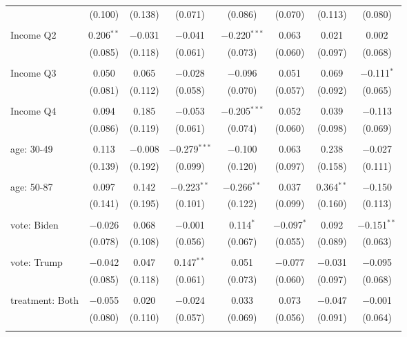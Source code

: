 \begin{tabular}{@{\extracolsep{5pt}}lccccccc}
  & (0.100) & (0.138) & (0.071) & (0.086) & (0.070) & (0.113) & (0.080) \\ 
  & & & & & & & \\ 
 Income Q2 & 0.206$^{**}$ & $-$0.031 & $-$0.041 & $-$0.220$^{***}$ & 0.063 & 0.021 & 0.002 \\ 
  & (0.085) & (0.118) & (0.061) & (0.073) & (0.060) & (0.097) & (0.068) \\ 
  & & & & & & & \\ 
 Income Q3 & 0.050 & 0.065 & $-$0.028 & $-$0.096 & 0.051 & 0.069 & $-$0.111$^{*}$ \\ 
  & (0.081) & (0.112) & (0.058) & (0.070) & (0.057) & (0.092) & (0.065) \\ 
  & & & & & & & \\ 
 Income Q4 & 0.094 & 0.185 & $-$0.053 & $-$0.205$^{***}$ & 0.052 & 0.039 & $-$0.113 \\ 
  & (0.086) & (0.119) & (0.061) & (0.074) & (0.060) & (0.098) & (0.069) \\ 
  & & & & & & & \\ 
 age: 30-49 & 0.113 & $-$0.008 & $-$0.279$^{***}$ & $-$0.100 & 0.063 & 0.238 & $-$0.027 \\ 
  & (0.139) & (0.192) & (0.099) & (0.120) & (0.097) & (0.158) & (0.111) \\ 
  & & & & & & & \\ 
 age: 50-87 & 0.097 & 0.142 & $-$0.223$^{**}$ & $-$0.266$^{**}$ & 0.037 & 0.364$^{**}$ & $-$0.150 \\ 
  & (0.141) & (0.195) & (0.101) & (0.122) & (0.099) & (0.160) & (0.113) \\ 
  & & & & & & & \\ 
 vote: Biden & $-$0.026 & 0.068 & $-$0.001 & 0.114$^{*}$ & $-$0.097$^{*}$ & 0.092 & $-$0.151$^{**}$ \\ 
  & (0.078) & (0.108) & (0.056) & (0.067) & (0.055) & (0.089) & (0.063) \\ 
  & & & & & & & \\ 
 vote: Trump & $-$0.042 & 0.047 & 0.147$^{**}$ & 0.051 & $-$0.077 & $-$0.031 & $-$0.095 \\ 
  & (0.085) & (0.118) & (0.061) & (0.073) & (0.060) & (0.097) & (0.068) \\ 
  & & & & & & & \\ 
 treatment: Both & $-$0.055 & 0.020 & $-$0.024 & 0.033 & 0.073 & $-$0.047 & $-$0.001 \\ 
  & (0.080) & (0.110) & (0.057) & (0.069) & (0.056) & (0.091) & (0.064) \\ 
  & & & & & & & \\ 

\end{tabular}

